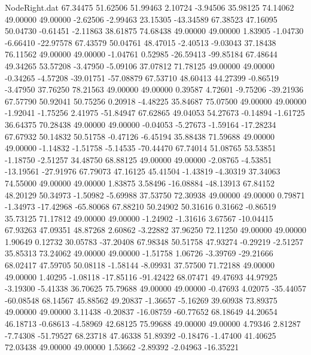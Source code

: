 \begin{filecontents}{NodeRight.dat}
  67.34475   51.62506   51.99463     2.10724   -3.94506   35.98125   74.14062   49.00000   49.00000   -2.62506   -2.99463   23.15305  -43.34589
  67.38523   47.16095   50.04730    -0.61451   -2.11863   38.61875   74.68438   49.00000   49.00000    1.83905   -1.04730   -6.66410  -22.97578
  67.43579   50.04761   48.47015    -2.40513   -9.03043   37.18438   76.11562   49.00000   49.00000   -1.04761    0.52985  -26.59413  -99.85184
  67.48644   49.34265   53.57208    -3.47950   -5.09106   37.07812   71.78125   49.00000   49.00000   -0.34265   -4.57208  -39.01751  -57.08879
  67.53710   48.60413   44.27399    -0.86519   -3.47950   37.76250   78.21563   49.00000   49.00000    0.39587    4.72601   -9.75206  -39.21936
  67.57790   50.92041   50.75256     0.20918   -4.48225   35.84687   75.07500   49.00000   49.00000   -1.92041   -1.75256    2.41975  -51.84947
  67.62865   49.04053   54.27673    -0.14894   -1.61725   36.64375   70.28438   49.00000   49.00000   -0.04053   -5.27673   -1.59164  -17.28234
  67.67932   50.14832   50.51758    -0.47126   -6.45194   35.88438   71.59688   49.00000   49.00000   -1.14832   -1.51758   -5.14535  -70.44470
  67.74014   51.08765   53.53851    -1.18750   -2.51257   34.48750   68.88125   49.00000   49.00000   -2.08765   -4.53851  -13.19561  -27.91976
  67.79073   47.16125   45.41504    -1.43819   -4.30319   37.34063   74.55000   49.00000   49.00000    1.83875    3.58496  -16.08884  -48.13913
  67.84152   48.20129   50.34973    -1.50982   -5.69988   37.53750   72.30938   49.00000   49.00000    0.79871   -1.34973  -17.42968  -65.80068
  67.88210   50.24902   50.31616     0.31662   -0.86519   35.73125   71.17812   49.00000   49.00000   -1.24902   -1.31616    3.67567  -10.04415
  67.93263   47.09351   48.87268     2.60862   -3.22882   37.96250   72.11250   49.00000   49.00000    1.90649    0.12732   30.05783  -37.20408
  67.98348   50.51758   47.93274    -0.29219   -2.51257   35.85313   73.24062   49.00000   49.00000   -1.51758    1.06726   -3.39769  -29.21666
  68.02417   47.59705   50.08118    -1.58144   -8.09931   37.57500   71.72188   49.00000   49.00000    1.40295   -1.08118  -17.85116  -91.42422
  68.07471   49.47693   44.97925    -3.19300   -5.41338   36.70625   75.79688   49.00000   49.00000   -0.47693    4.02075  -35.44057  -60.08548
  68.14567   45.88562   49.20837    -1.36657   -5.16269   39.60938   73.89375   49.00000   49.00000    3.11438   -0.20837  -16.08759  -60.77652
  68.18649   44.20654   46.18713    -0.68613   -4.58969   42.68125   75.99688   49.00000   49.00000    4.79346    2.81287   -7.74308  -51.79527
  68.23718   47.46338   51.89392    -0.18476   -1.47400   41.40625   72.03438   49.00000   49.00000    1.53662   -2.89392   -2.04963  -16.35221

\end{filecontents}
